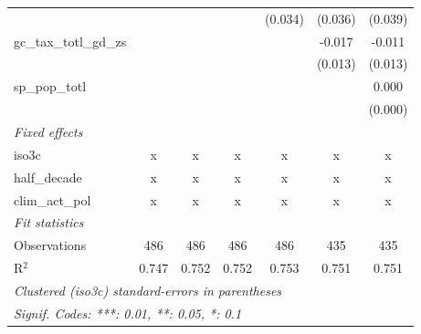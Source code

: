 \begin{tabular}{lcccccc}
                                                             &         &                &                & (0.034)        & (0.036)        & (0.039)\\   
   gc\_tax\_totl\_gd\_zs                                     &         &                &                &                & -0.017         & -0.011\\   
                                                             &         &                &                &                & (0.013)        & (0.013)\\   
   sp\_pop\_totl                                             &         &                &                &                &                & 0.000\\   
                                                             &         &                &                &                &                & (0.000)\\   
   \emph{Fixed effects}\\
   iso3c                                                     & x       & x              & x              & x              & x              & x\\  
   half\_decade                                              & x       & x              & x              & x              & x              & x\\  
   clim\_act\_pol                                            & x       & x              & x              & x              & x              & x\\  
   \midrule \emph{Fit statistics}\\
   Observations                                              & 486     & 486            & 486            & 486            & 435            & 435\\  
   R$^2$                                                     & 0.747   & 0.752          & 0.752          & 0.753          & 0.751          & 0.751\\  
   \midrule
   \multicolumn{7}{l}{\emph{Clustered (iso3c) standard-errors in parentheses}}\\
   \multicolumn{7}{l}{\emph{Signif. Codes: ***: 0.01, **: 0.05, *: 0.1}}\\
\end{tabular}
\par\endgroup


